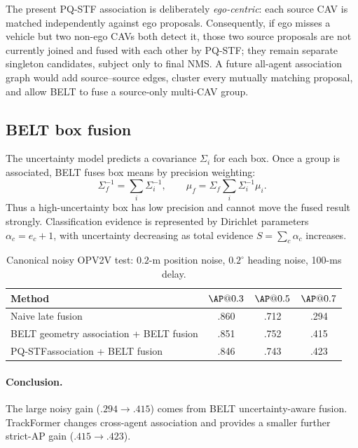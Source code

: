 \documentclass[11pt]{article}
\newcommand{\PQSTF}{\textsc{PQ-STF}}
\begin{document}
The present PQ-STF association is deliberately \emph{ego-centric}: each source CAV is matched independently against ego proposals.  Consequently, if ego misses a vehicle but two non-ego CAVs both detect it, those two source proposals are not currently joined and fused with each other by PQ-STF; they remain separate singleton candidates, subject only to final NMS.  A future all-agent association graph would add source--source edges, cluster every mutually matching proposal, and allow BELT to fuse a source-only multi-CAV group.

\subsection{BELT box fusion}

The uncertainty model predicts a covariance $\Sigma_i$ for each box. Once a group is associated, BELT fuses box means by precision weighting:
\begin{equation}
\Sigma_f^{-1}=\sum_i\Sigma_i^{-1},\qquad \mu_f=\Sigma_f\sum_i\Sigma_i^{-1}\mu_i.
\end{equation}
Thus a high-uncertainty box has low precision and cannot move the fused result strongly. Classification evidence is represented by Dirichlet parameters $\alpha_c=e_c+1$, with uncertainty decreasing as total evidence $S=\sum_c\alpha_c$ increases.

\begin{table}[h]
\centering
\caption{Canonical noisy OPV2V test: $0.2$-m position noise, $0.2^\circ$ heading noise, 100-ms delay.}
\begin{tabular}{lccc}
\toprule
Method & $\AP@0.3$ & $\AP@0.5$ & $\AP@0.7$\\
\midrule
Naive late fusion & .860 & .712 & .294\\
BELT geometry association + BELT fusion & .851 & .752 & .415\\
\PQSTF association + BELT fusion & .846 & .743 & .423\\
\bottomrule
\end{tabular}
\end{table}

\paragraph{Conclusion.} The large noisy gain ($.294\rightarrow.415$) comes from BELT uncertainty-aware fusion. TrackFormer changes cross-agent association and provides a smaller further strict-AP gain ($.415\rightarrow.423$).
\end{document}
